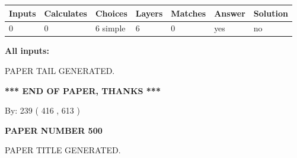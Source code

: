 \documentclass[12pt]{article}
\begin{document}
   
   
   
\noindent\begin{tabular}{|l|l|l|l|l|l|l|}
 \hline
Inputs & Calculates & Choices & Layers & Matches & Answer & Solution \\ \hline
 0  & 
 0  & 
 6
  simple  
  & 
 6  & 
 0  & 
  yes & 
  no 
  \\ \hline
 \end{tabular}
   
   
   
   
\noindent{}
   
   
   
   
\noindent\vspace{0.1in}\hspace{-0.08in} {\textbf{\Large{All inputs: }}}
   
   
   
   
   
   
 \vspace{0.2in}
 
   
   
\vspace{2.0in} PAPER TAIL GENERATED.
   
   
   
   
\vspace{1.0in} 
{\textbf{\large{ *** END OF PAPER, THANKS *** }}} 
   
   
\hspace{1.0in} By: 
 239 ( 416 ,  613 )
   
   
   
   
\newpage 
\setcounter{page}{ 
   500001 } 
   
   
   
   
 {\textbf{ \Large{ PAPER NUMBER  500  }}}
   
   
\vspace{0.2in}
   
   
   
   
   
   
   
   
 \vspace{0.2in}
 
 
 
 
   
   
 PAPER TITLE GENERATED.
   
   
   
\end{document}
